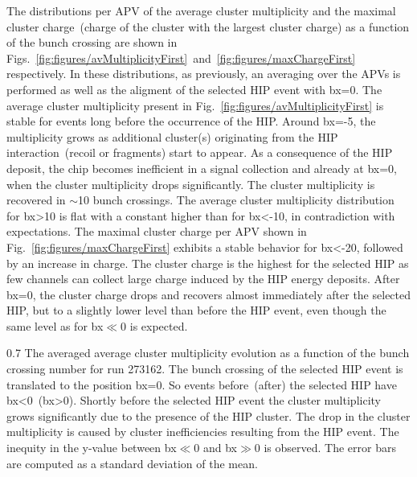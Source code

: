 The distributions per APV of the average cluster multiplicity and the maximal cluster charge~(charge of the cluster with the largest cluster charge) as a function of the bunch crossing are shown in Figs.~\ref{fig:figures/avMultiplicityFirst}~and~\ref{fig:figures/maxChargeFirst} respectively. In these distributions, as previously, an averaging over the APVs is performed as well as the aligment of the selected HIP event with bx=0. The average cluster multiplicity present in Fig.~\ref{fig:figures/avMultiplicityFirst} is stable for events long before the occurrence of the HIP. Around bx=-5, the multiplicity grows as additional cluster(s) originating from the HIP interaction~(recoil or fragments) start to appear. As a consequence of the HIP deposit, the chip becomes inefficient in a signal collection and already at bx=0, when  the cluster multiplicity drops significantly. The cluster multiplicity is recovered in $\sim$10 bunch crossings. The average cluster multiplicity distribution for bx>10 is flat with a constant higher than for bx<-10, in contradiction with expectations. The maximal cluster charge per APV shown in Fig.~\ref{fig:figures/maxChargeFirst} exhibits a stable behavior for bx<-20, followed by an increase in charge. The cluster charge is the highest for the selected HIP as few channels can collect large charge induced by the HIP energy deposits. After bx=0, the cluster charge drops and recovers almost immediately after the selected HIP, but to a slightly lower level than before the HIP event, even though the same level as for bx$\ll$0 is expected. 



                 {0.7}       %
                 {The averaged average cluster multiplicity evolution as a function of the bunch crossing number for run 273162. The bunch crossing of the selected HIP event is translated to the position bx=0. So events before~(after) the selected HIP have bx<0~(bx>0). Shortly before the selected HIP event the cluster multiplicity grows significantly due to the presence of the HIP cluster. The drop in the cluster multiplicity is caused by cluster inefficiencies resulting from the HIP event. The inequity in the y-value between bx$\ll$0 and bx$\gg$0 is observed. The error bars are computed as a standard deviation of the mean. } %

